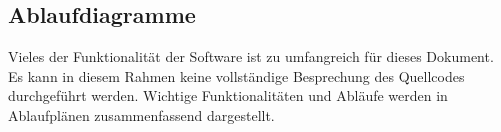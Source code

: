 \subsection{Ablaufdiagramme}
%
Vieles der Funktionalität der Software ist zu umfangreich für dieses Dokument. Es kann in diesem Rahmen keine vollständige Besprechung des Quellcodes durchgeführt werden. Wichtige Funktionalitäten und Abläufe werden in Ablaufplänen zusammenfassend dargestellt.
%

%

%

%


